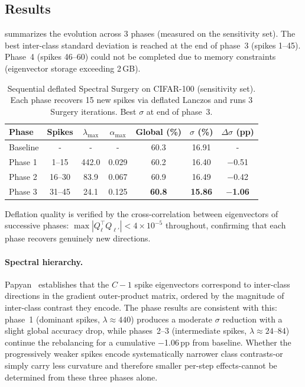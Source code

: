 \documentclass[11pt,a4paper]{article}
\begin{document}
\subsection{Results}

 summarizes the evolution across 3 phases
(measured on the sensitivity set). The best inter-class standard
deviation is reached at the end of phase~3 (spikes 1--45). Phase~4
(spikes 46--60) could not be completed due to memory constraints
(eigenvector storage exceeding 2\,GB).

\begin{table}[ht]
\centering
\caption{Sequential deflated Spectral Surgery on CIFAR-100 (sensitivity
set). Each phase recovers 15 new spikes via deflated Lanczos and runs
3 Surgery iterations. Best $\sigma$ at end of phase~3.}
\label{tab:cifar100-phases}
\begin{tabular}{lcccccc}
\toprule
Phase & Spikes & $\lambda_{\max}$ & $\alpha_{\max}$
  & Global (\%) & $\sigma$ (\%) & $\Delta\sigma$ (pp) \\
\midrule
Baseline & - & - & - & 60.3 & 16.91 & - \\
Phase 1 & 1--15 & 442.0 & 0.029 & 60.2 & 16.40 & $-$0.51 \\
Phase 2 & 16--30 & 83.9 & 0.067 & 60.9 & 16.49 & $-$0.42 \\
Phase 3 & 31--45 & 24.1 & 0.125 & \textbf{60.8} & \textbf{15.86}
  & $\bm{-}$\textbf{1.06} \\
\bottomrule
\end{tabular}
\end{table}

Deflation quality is verified by the cross-correlation between
eigenvectors of successive phases: $\max |Q_\ell^\top Q_{\ell'}| <
4 \times 10^{-5}$ throughout, confirming that each phase recovers
genuinely new directions.

\paragraph{Spectral hierarchy.}
Papyan~\cite{papyan2020} establishes that the $C{-}1$ spike eigenvectors
correspond to inter-class directions in the gradient outer-product
matrix, ordered by the magnitude of inter-class contrast they encode.
The phase results are consistent with this: phase~1 (dominant spikes,
$\lambda \approx 440$) produces a moderate $\sigma$ reduction with a
slight global accuracy drop, while phases~2--3 (intermediate spikes,
$\lambda \approx 24$--$84$) continue the rebalancing for a cumulative
$-$1.06\,pp from baseline. Whether the progressively weaker spikes
encode systematically narrower class contrasts-or simply carry less
curvature and therefore smaller per-step effects-cannot be
determined from these three phases alone.
\end{document}
